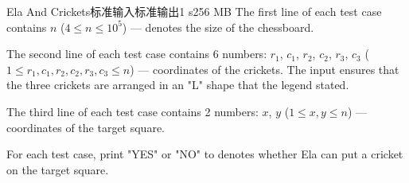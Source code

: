 \begin{problem}{Ela And Crickets}{标准输入}{标准输出}{1 s}{256 MB}
The first line of each test case contains $n$ ($4 \le n \le 10^5$) — denotes the size of the chessboard.

The second line of each test case contains 6 numbers: $r_1$, $c_1$, $r_2$, $c_2$, $r_3$, $c_3$ ($1 \le r_1, c_1, r_2, c_2, r_3, c_3 \le n$) — coordinates of the crickets. The input ensures that the three crickets are arranged in an "L" shape that the legend stated.

The third line of each test case contains 2 numbers: $x$, $y$ ($1 \le x, y \le n$) — coordinates of the target square.

\OutputFile
For each test case, print "YES" or "NO" to denotes whether Ela can put a cricket on the target square.

\Example
\begin{example}
\end{example}
\end{problem}